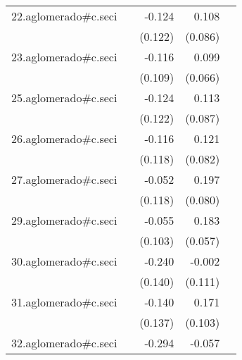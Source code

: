 {\begin{longtable}{l*{4}{D{.}{.}{-1}}}
\addlinespace
22.aglomerado#c.seci&                     &      -0.124         &       0.108         &                     \\
            &                     &     (0.122)         &     (0.086)         &                     \\
\addlinespace
23.aglomerado#c.seci&                     &      -0.116         &       0.099         &                     \\
            &                     &     (0.109)         &     (0.066)         &                     \\
\addlinespace
25.aglomerado#c.seci&                     &      -0.124         &       0.113         &                     \\
            &                     &     (0.122)         &     (0.087)         &                     \\
\addlinespace
26.aglomerado#c.seci&                     &      -0.116         &       0.121         &                     \\
            &                     &     (0.118)         &     (0.082)         &                     \\
\addlinespace
27.aglomerado#c.seci&                     &      -0.052         &       0.197\sym{*}  &                     \\
            &                     &     (0.118)         &     (0.080)         &                     \\
\addlinespace
29.aglomerado#c.seci&                     &      -0.055         &       0.183\sym{**} &                     \\
            &                     &     (0.103)         &     (0.057)         &                     \\
\addlinespace
30.aglomerado#c.seci&                     &      -0.240         &      -0.002         &                     \\
            &                     &     (0.140)         &     (0.111)         &                     \\
\addlinespace
31.aglomerado#c.seci&                     &      -0.140         &       0.171         &                     \\
            &                     &     (0.137)         &     (0.103)         &                     \\
\addlinespace
32.aglomerado#c.seci&                     &      -0.294\sym{*}  &      -0.057         &                     \\

\end{longtable}}
